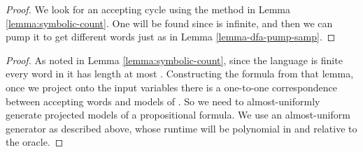 \documentclass[a4paper,USenglish,numberwithinsect]{lipics}
\theoremstyle{plain}
\theoremstyle{definition}
\begin{document}
\lemmaSymbPumpSamp*
\begin{proof}
We look for an accepting cycle using the method in Lemma \ref{lemma:symbolic-count}. One will be found since  is infinite, and then we can pump it to get  different words just as in Lemma \ref{lemma-dfa-pump-samp}.
\end{proof}

\lemmaSymbUnifSamp*
\begin{proof}
As noted in Lemma \ref{lemma:symbolic-count}, since the language is finite every word in it has length at most . Constructing the formula  from that lemma, once we project onto the input variables there is a one-to-one correspondence between accepting words and models of . So we need to almost-uniformly generate projected models of a propositional formula. We use an almost-uniform generator as described above, whose runtime will be polynomial in  and  relative to the oracle.
\end{proof}
\end{document}
